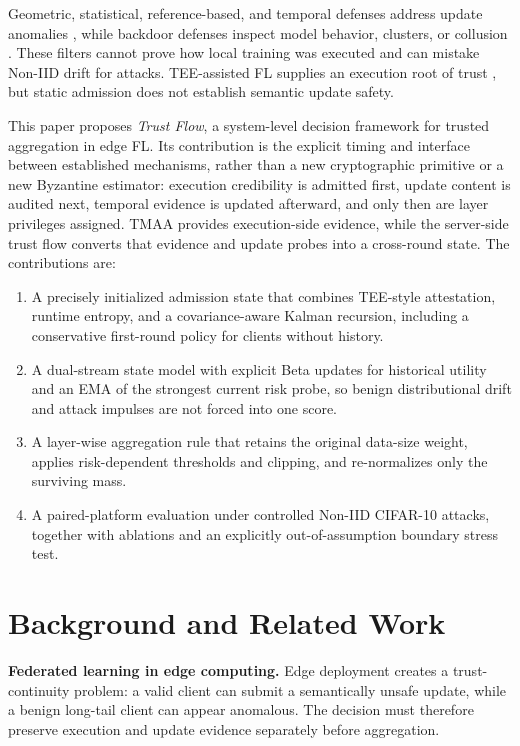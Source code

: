 \documentclass[runningheads,orivec]{llncs}
\newenvironment{tightenumerate}{%
    \begin{enumerate}\setlength{\itemsep}{1pt}\setlength{\parskip}{0pt}\setlength{\parsep}{0pt}}{\end{enumerate}}
\begin{document}
Geometric, statistical, reference-based, and temporal defenses address update anomalies \cite{blanchard2017krum,yin2018byzantine,cao2021fltrust,fung2020foolsgold,fldetector2022}, while backdoor defenses inspect model behavior, clusters, or collusion \cite{deepsight2022,flame2022,crowdguard2024,roseagg}. These filters cannot prove how local training was executed and can mistake Non-IID drift for attacks. TEE-assisted FL supplies an execution root of trust \cite{r1_tee_integrity,xu2021distributed,r5_tee_mitigating,lu2025tmt}, but static admission does not establish semantic update safety.

This paper proposes \emph{Trust Flow}, a system-level decision framework for trusted aggregation in edge FL. Its contribution is the explicit timing and interface between established mechanisms, rather than a new cryptographic primitive or a new Byzantine estimator: execution credibility is admitted first, update content is audited next, temporal evidence is updated afterward, and only then are layer privileges assigned. TMAA provides execution-side evidence, while the server-side trust flow converts that evidence and update probes into a cross-round state. The contributions are:
\begin{tightenumerate}
    \item A precisely initialized admission state that combines TEE-style attestation, runtime entropy, and a covariance-aware Kalman recursion, including a conservative first-round policy for clients without history.
    \item A dual-stream state model with explicit Beta updates for historical utility and an EMA of the strongest current risk probe, so benign distributional drift and attack impulses are not forced into one score.
    \item A layer-wise aggregation rule that retains the original data-size weight, applies risk-dependent thresholds and clipping, and re-normalizes only the surviving mass.
    \item A paired-platform evaluation under controlled Non-IID CIFAR-10 attacks, together with ablations and an explicitly out-of-assumption boundary stress test.
\end{tightenumerate}

\section{Background and Related Work}

\textbf{Federated learning in edge computing.} Edge deployment creates a trust-continuity problem: a valid client can submit a semantically unsafe update, while a benign long-tail client can appear anomalous. The decision must therefore preserve execution and update evidence separately before aggregation.
\end{document}
